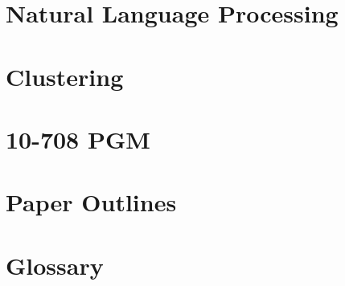 \documentclass[a4paper, 12pt]{report}
\begin{document}
    

    \chapter{Natural Language Processing}

    

    \chapter{Clustering}

    

    \chapter{10-708 PGM}

    

    \chapter{Paper Outlines}

    

    \chapter{Glossary}

    

    \printbibliography
\end{document}
